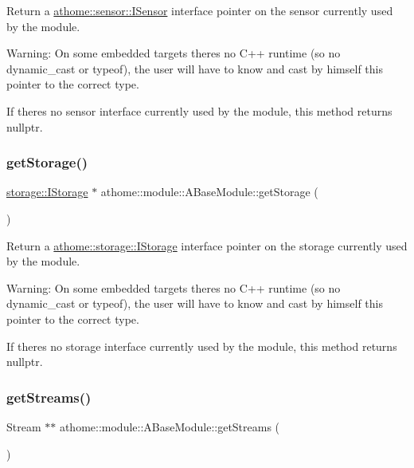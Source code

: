 Return a \mbox{\hyperlink{classathome_1_1sensor_1_1_i_sensor}{athome\+::sensor\+::\+I\+Sensor}} interface pointer on the sensor currently used by the module.

Warning\+: On some embedded targets there\textquotesingle{}s no C++ runtime (so no {\ttfamily dynamic\+\_\+cast} or {\ttfamily typeof}), the user will have to know and cast by himself this pointer to the correct type.

If there\textquotesingle{}s no sensor interface currently used by the module, this method returns {\ttfamily nullptr}. \mbox{\label{classathome_1_1module_1_1_a_base_module_accc6c7f840dab1b1e67fe910c833f0b7}} 
\subsubsection{\texorpdfstring{get\+Storage()}{getStorage()}}
{\footnotesize\ttfamily \mbox{\hyperlink{classathome_1_1storage_1_1_i_storage}{storage\+::\+I\+Storage}} $\ast$ athome\+::module\+::\+A\+Base\+Module\+::get\+Storage (\begin{DoxyParamCaption}{ }\end{DoxyParamCaption})}

Return a \mbox{\hyperlink{classathome_1_1storage_1_1_i_storage}{athome\+::storage\+::\+I\+Storage}} interface pointer on the storage currently used by the module.

Warning\+: On some embedded targets there\textquotesingle{}s no C++ runtime (so no {\ttfamily dynamic\+\_\+cast} or {\ttfamily typeof}), the user will have to know and cast by himself this pointer to the correct type.

If there\textquotesingle{}s no storage interface currently used by the module, this method returns {\ttfamily nullptr}. \mbox{\label{classathome_1_1module_1_1_a_base_module_adc612512d2acb7bc3f3d533bcc1aa41b}} 
\subsubsection{\texorpdfstring{get\+Streams()}{getStreams()}}
{\footnotesize\ttfamily Stream $\ast$$\ast$ athome\+::module\+::\+A\+Base\+Module\+::get\+Streams (\begin{DoxyParamCaption}{ }\end{DoxyParamCaption})}

